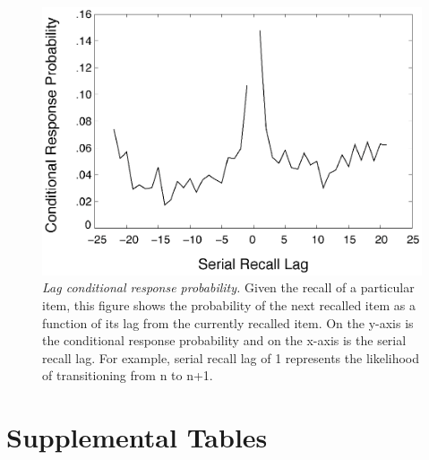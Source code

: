 \begin{figure}
  \centering
  \includegraphics[width=\textwidth]{figures/chapter1_suppfigure2.eps}
  \caption[Behavioral experiment 3: Lag conditional response probability.]{\textit{Lag conditional response probability.} Given the recall of a particular item, this figure shows the probability of the next recalled item as a function of its lag from the currently recalled item. On the y-axis is the conditional response probability and on the x-axis is the serial recall lag. For example, serial recall lag of 1 represents the likelihood of transitioning from n to n+1.}
  \label{chapter1_suppfigure2}
\end{figure}

\section{Supplemental Tables}\label{supplemental-tables}

